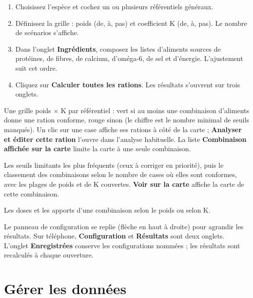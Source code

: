 \documentclass[11pt,a4paper]{article}
\newcommand{\ui}[1]{\textsf{\textbf{#1}}}
\begin{document}
\begin{enumerate}
  \item Choisissez l'espèce et cochez un ou plusieurs référentiels généraux.
  \item Définissez la grille : poids (de, à, pas) et coefficient K (de, à, pas). Le nombre de
        scénarios s'affiche.
  \item Dans l'onglet \ui{Ingrédients}, composez les listes d'aliments sources de protéines, de
        fibres, de calcium, d'oméga-6, de sel et d'énergie. L'ajustement suit cet ordre.
  \item Cliquez sur \ui{Calculer toutes les rations}. Les résultats s'ouvrent sur trois onglets.
\end{enumerate}

\begin{description}[style=nextline,leftmargin=0pt,itemsep=4pt]
  \item[\ui{Carte}] Une grille poids $\times$ K par référentiel : vert si au moins une
        combinaison d'aliments donne une ration conforme, rouge sinon (le chiffre est le nombre
        minimal de seuils manqués). Un clic sur une case affiche ses rations à côté de la carte ;
        \ui{Analyser et éditer cette ration} l'ouvre dans l'analyse habituelle. La liste
        \ui{Combinaison affichée sur la carte} limite la carte à une seule combinaison.
  \item[\ui{Combinaisons}] Les seuils limitants les plus fréquents (ceux à corriger en
        priorité), puis le classement des combinaisons selon le nombre de cases où elles sont
        conformes, avec les plages de poids et de K couvertes. \ui{Voir sur la carte} affiche
        la carte de cette combinaison.
  \item[\ui{Courbes}] Les doses et les apports d'une combinaison selon le poids ou selon K.
\end{description}

Le panneau de configuration se replie (flèche en haut à droite) pour agrandir les résultats. Sur
téléphone, \ui{Configuration} et \ui{Résultats} sont deux onglets. L'onglet \ui{Enregistrées}
conserve les configurations nommées ; les résultats sont recalculés à chaque ouverture.

\section{Gérer les données}
\end{document}

